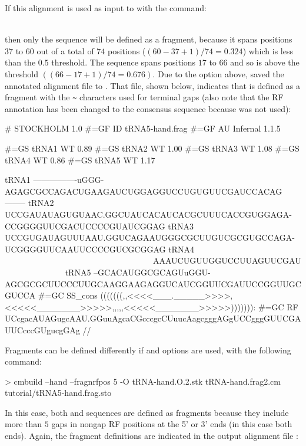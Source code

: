 If this alignment is used as input to  with the command:

\\

then only the  sequence will be defined as a fragment,
because it spans positions $37$ to $60$ out of a total of $74$
positions ($(60-37+1)/74 = 0.324$) which is less than the $0.5$
threshold. The  sequence spans positions $17$ to $66$ and
so is above the threshold $((66-17+1)/74 = 0.676)$. Due to the 
option above,  saved the annotated alignment file to 
. That file, shown below, indicates that  is
defined as a fragment with the \verb+~+ characters used for terminal gaps (also note that
the RF annotation has been changed to the consensus sequence because
 was not used):

\newpage

\begin{sreoutput}
# STOCKHOLM 1.0
#=GF ID tRNA5-hand.frag
#=GF AU Infernal 1.1.5

#=GS tRNA1 WT 0.89
#=GS tRNA2 WT 1.00
#=GS tRNA3 WT 1.08
#=GS tRNA4 WT 0.86
#=GS tRNA5 WT 1.17

tRNA1        ----------------uGGG-AGAGCGCCAGACUGAAGAUCUGGAGGUCCUGUGUUCGAUCCACAG--------
tRNA2        UCCGAUAUAGUGUAAC.GGCUAUCACAUCACGCUUUCACCGUGGAGA-CCGGGGUUCGACUCCCCGUAUCGGAG
tRNA3        UCCGUGAUAGUUUAAU.GGUCAGAAUGGGCGCUUGUCGCGUGCCAGA-UCGGGGUUCAAUUCCCCGUCGCGGAG
tRNA4        ~~~~~~~~~~~~~~~~~~~~~~~~~~~~~~~~~~~~AAAUCUGUUGGUCCUUAGUUCGAU~~~~~~~~~~~~~~
tRNA5        --GCACAUGGCGCAGUuGGU-AGCGCGCUUCCCUUGCAAGGAAGAGGUCAUCGGUUCGAUUCCGGUUGCGUCCA
#=GC SS_cons (((((((,,<<<<___._____>>>>,<<<<<_______>>>>>,,,,,<<<<<_______>>>>>))))))):
#=GC RF      UCcgacAUAGugcAAU.GGuuAgcaCGcccgcCUuucAagcgggAGgUCCgggGUUCGAUUCcccGUgucgGAg
//
\end{sreoutput}

Fragments can be defined differently if  and
 options are used, with the following command:

\begin{widesreoutput}
> cmbuild --hand --fragnrfpos 5 -O tRNA-hand.O.2.stk tRNA-hand.frag2.cm tutorial/tRNA5-hand.frag.sto
\end{widesreoutput}
  
In this case, both  and  sequences are defined as
fragments because they include more than $5$ gaps in nongap RF positions
at the 5' or 3' ends (in this case both ends). Again, the fragment
definitions are indicated in the output alignment file
:

